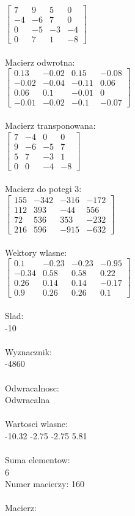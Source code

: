 \documentclass[a4paper,12pt]{article}
\begin{document}
$\begin{bmatrix} 7&9&5&0\\-4&-6&7&0\\0&-5&-3&-4\\0&7&1&-8 \end{bmatrix}$
\\
\\
Macierz odwrotna:\\

$\begin{bmatrix} 0.13&-0.02&0.15&-0.08\\-0.02&-0.04&-0.11&0.06\\0.06&0.1&-0.01&0\\-0.01&-0.02&-0.1&-0.07 \end{bmatrix}$
\\
\\
Macierz transponowana:\\

$\begin{bmatrix} 7&-4&0&0\\9&-6&-5&7\\5&7&-3&1\\0&0&-4&-8 \end{bmatrix}$
\\
\\
Macierz do potegi 3:\\

$\begin{bmatrix} 155&-342&-316&-172\\112&393&-44&556\\72&536&353&-232\\216&596&-915&-632 \end{bmatrix}$
\\
\\
Wektory wlasne:\\

$\begin{bmatrix} 0.1&-0.23&-0.23&-0.95\\-0.34&0.58&0.58&0.22\\0.26&0.14&0.14&-0.17\\0.9&0.26&0.26&0.1 \end{bmatrix}$
\\
\\
Slad:\\
-10
\\
\\
Wyznacznik:\\
-4860
\\
\\
Odwracalnosc:\\
Odwracalna
\\
\\
Wartosci wlasne:\\
-10.32 -2.75 -2.75 5.81
\\
\\
Suma elementow:\\
6
\\
\newpage
Numer macierzy:
160
\\
\\
Macierz:\\
\end{document}
